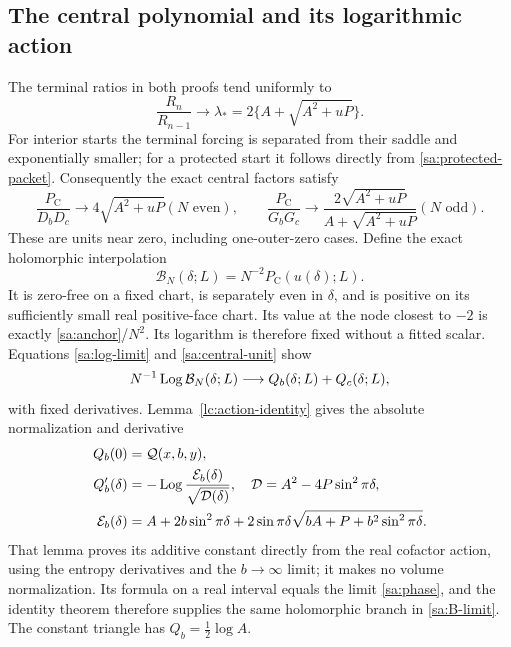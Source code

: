 \subsection{The central polynomial and its logarithmic action}
The terminal ratios in both proofs tend uniformly to
\[
 \frac{R_n}{R_{n-1}}\longrightarrow
       \lambda_*=2\{A+\sqrt{A^2+uP}\}.
\]
For interior starts the terminal forcing is separated from their
saddle and exponentially smaller; for a protected start it follows
directly from \eqref{sa:protected-packet}.
Consequently the exact central factors satisfy
\begin{equation}\label{sa:central-unit}
 \frac{P_{\mathrm C}}{D_bD_c}\longrightarrow4\sqrt{A^2+uP} (N\text{ even}),
 \qquad
 \frac{P_{\mathrm C}}{G_bG_c}\longrightarrow
           \frac{2\sqrt{A^2+uP}}{A+\sqrt{A^2+uP}} (N\text{ odd}).
\end{equation}
These are units near zero, including one-outer-zero cases.
Define the exact holomorphic interpolation
\begin{equation}\label{sa:exact-B}
 \mathcal B_N(\delta;L)=N^{-2}P_{\mathrm C}(u(\delta);L).
\end{equation}
It is zero-free on a fixed chart, is separately even in $\delta$,
and is positive on its sufficiently small real positive-face chart.
Its value at the node closest to $-2$ is exactly \eqref{sa:anchor}/$N^2$.
Its logarithm is therefore fixed without a fitted scalar. Equations
\eqref{sa:log-limit} and \eqref{sa:central-unit} show
\begin{equation}\label{sa:B-limit}
 N^{-1}\operatorname{Log}\mathcal B_N(\delta;L)
                \longrightarrow Q_b(\delta;L)+Q_c(\delta;L),
\end{equation}
with fixed derivatives. Lemma~\ref{lc:action-identity} gives the absolute
normalization and derivative
\begin{align}
 Q_b(0)&=\mathcal Q(x,b,y),\notag\\
 Q_b'(\delta)&=-\operatorname{Log}\frac{\mathcal E_b(\delta)}{\sqrt{\mathcal D(\delta)}},
 \quad\mathcal D=A^2-4P\sin^2\pi\delta,\label{sa:Q-derivative}\\
 \mathcal E_b(\delta)&=A+2b\sin^2\pi\delta
       +2\sin\pi\delta\sqrt{bA+P+b^2\sin^2\pi\delta}.\notag
\end{align}
That lemma proves its additive constant directly from the real
cofactor action, using the entropy derivatives and the $b\to\infty$
limit; it makes no volume normalization. Its formula on a real
interval equals the limit \eqref{sa:phase}, and the identity theorem
therefore supplies the same holomorphic branch in \eqref{sa:B-limit}.
The constant triangle has $Q_b=\tfrac12\log A$.

